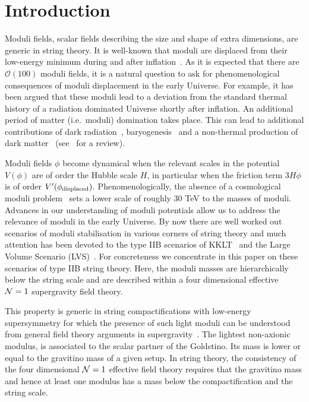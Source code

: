 \documentclass[12pt]{article}
\begin{document}
\tableofcontents

\section{Introduction}
Moduli fields, scalar fields describing the size and shape of extra dimensions, are generic in string theory. It is well-known that moduli are displaced from their low-energy minimum during and after inflation~\cite{Coughlan:1983ci,Banks:1993en,deCarlos:1993wie}. As it is expected that there are $\mathcal{O}(100)$ moduli fields, it is a natural question to ask for phenomenological consequences of moduli displacement in the early Universe. For example, it has been argued that these moduli lead to a deviation from the standard thermal history of a radiation dominated Universe shortly after inflation. An additional period of matter (i.e.~moduli) domination takes place. This can lead to additional contributions of dark radiation~\cite{Cicoli:2012aq, Higaki:2012ar}, baryogenesis~\cite{Allahverdi:2016yws} and a non-thermal production of dark matter~\cite{Allahverdi:2013noa} (see~\cite{Kane:2015jia} for a review).

Moduli fields $\phi$ become dynamical when the relevant scales in the potential $V(\phi)$ are of order the Hubble scale $H$, in particular when the friction term $3H\dot{\phi}$ is of order $V'(\phi_{\rm displaced}).$ 
Phenomenologically, the absence of a cosmological moduli problem~\cite{Coughlan:1983ci,Banks:1993en,deCarlos:1993wie} sets a lower scale of roughly 30 TeV to the masses of moduli. Advances in our understanding of moduli potentials allow us to address the relevance of moduli in the early Universe. By now there are well worked out scenarios of moduli stabilisation in various corners of string theory and much attention has been devoted to the type IIB scenarios of KKLT~\cite{Kachru:2003aw} and the Large Volume Scenario (LVS)~\cite{Balasubramanian:2005zx,Conlon:2005ki}. For concreteness we concentrate in this paper on these scenarios of type IIB string theory. Here, the moduli masses are hierarchically below the string scale and are described within a four dimensional effective ${\cal N}=1$ supergravity field theory.

This property is generic in string compactifications with low-energy supersymmetry for which the presence of such light moduli can be understood from general field theory arguments in supergravity~\cite{deCarlos:1993wie, 0804.3730, 0804.1073,0706.2785,hep-th/0602246,hep-th/0606273}. The lightest non-axionic modulus, is associated to the scalar partner of the Goldstino. Its mass is lower or equal to the gravitino mass of a given setup. In string theory, the consistency of the four dimensional ${\cal N}=1$ effective field theory requires that the gravitino mass and hence at least one modulus has a mass below the compactification and the string scale.
\end{document}
